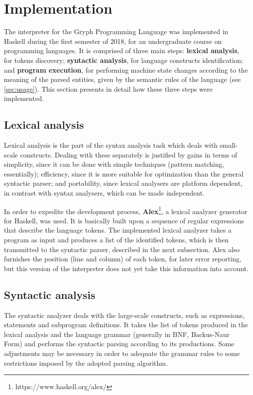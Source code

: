 \section{Implementation}
\label{sec:implement}

The interpreter for the Gryph Programming Language was implemented in Haskell during the first semester of 2018, for an undergraduate course on programming languages. It is comprised of three
main steps: \textbf{lexical analysis}, for tokens discovery;
\textbf{syntactic analysis}, for language constructs
identification; and \textbf{program execution}, for
performing machine state changes according to the
meaning of the parsed entities, given by the semantic
rules of the language (see \ref{sec:usage}). This section presents in detail how these three steps were implemented.

\subsection{Lexical analysis}

Lexical analysis is the part of the syntax analysis task
which deals with small-scale constructs. Dealing with these
separately is justified by gains in terms of simplicity, since
it can be done with simple techniques (pattern matching, essentially); efficiency, since it is
more suitable for optimization than the general syntactic parser; 
and portability, since lexical analysers are platform dependent, in contrast
with syntax analysers, which can be made independent.

In order to expedite the development process, \textbf{Alex}\footnote{https://www.haskell.org/alex/}, a lexical analyzer generator for Haskell, was used. It is basically built
upon a sequence of regular expressions that describe the 
language tokens. The implemented lexical analyzer takes a program as input and produces
a list of the identified tokens, which is then transmitted to the
syntactic parser, described in the next subsection. Alex also furnishes
the position (line and column) of each token, for later error reporting, but
this version of the interpreter does not yet take this information into account.

\subsection{Syntactic analysis}

The syntactic analyzer deals with the large-scale constructs, 
such as expressions, statements and subprogram definitions.
It takes the list of tokens produced in the lexical
analysis and the language grammar (generally in BNF, Backus-Naur Form) and performs
the syntactic parsing according to its productions.
Some adjustments may be necessary in order
to adequate the grammar rules to some restrictions imposed by
the adopted parsing algorithm.

